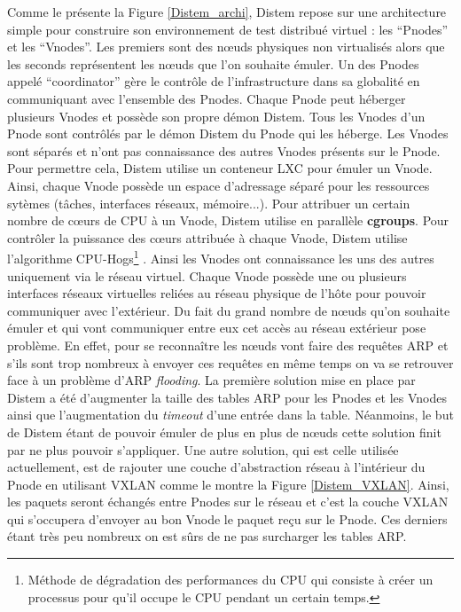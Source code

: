 Comme le présente la Figure \ref{Distem_archi}, Distem repose sur une
architecture simple pour construire son environnement de test distribué virtuel
: les ``Pnodes'' et les ``Vnodes''. Les premiers sont des n\oe uds physiques non
virtualisés alors que les seconds représentent les n\oe uds que l'on souhaite
émuler. Un des Pnodes appelé ``coordinator'' gère le contrôle de
l'infrastructure dans sa globalité en communiquant avec l'ensemble des
Pnodes. Chaque Pnode peut héberger plusieurs Vnodes et possède son
propre démon Distem. Tous les Vnodes d'un Pnode sont contrôlés par le
démon Distem du Pnode qui les héberge. Les Vnodes sont séparés et n'ont
pas connaissance des autres Vnodes présents sur le Pnode. Pour permettre
cela, Distem utilise un conteneur LXC pour émuler un Vnode. Ainsi, chaque
Vnode possède un espace d'adressage séparé pour les ressources sytèmes
(tâches, interfaces réseaux, mémoire...). Pour attribuer un certain nombre de
c\oe urs de CPU à un Vnode, Distem utilise en parallèle \textbf{cgroups}. Pour contrôler la puissance des c\oe urs attribuée à chaque
Vnode, Distem utilise l'algorithme CPU-Hogs\footnote{Méthode de dégradation
  des performances du CPU qui consiste à créer un processus pour qu'il occupe le
  CPU pendant un certain temps.} \citep{DISTEM_buchert2011methods}. Ainsi les
Vnodes ont connaissance les uns des autres uniquement via le réseau
virtuel. Chaque  Vnode possède une ou plusieurs interfaces réseaux virtuelles
reliées au réseau physique de l'hôte pour pouvoir communiquer avec
l'extérieur. Du fait du grand nombre de n\oe uds qu'on souhaite émuler et qui
vont communiquer entre eux cet accès au réseau extérieur pose problème. En
effet, pour se reconnaître les n\oe uds vont faire des requêtes ARP et s'ils
sont trop nombreux à envoyer ces requêtes en même temps on va se retrouver face
à un problème d'ARP \textit{flooding}. La première solution mise en place par Distem a
été d'augmenter la taille des tables ARP pour les Pnodes et les Vnodes
ainsi que l'augmentation du \textit{timeout} d'une entrée dans la
table. Néanmoins, le but de Distem étant de pouvoir émuler de plus en plus de
n\oe uds cette solution finit par ne plus pouvoir s'appliquer. Une autre
solution, qui est celle utilisée actuellement, est de rajouter une couche
d'abstraction réseau à l'intérieur du Pnode en utilisant
VXLAN \citep{VXLAN_mahalingam2014virtual, DISTEM_buchert2014emulation} comme le
montre la Figure \ref{Distem_VXLAN}. Ainsi, les paquets seront échangés entre
Pnodes sur le réseau et c'est la couche VXLAN qui s'occupera d'envoyer au
bon Vnode le paquet reçu sur le Pnode. Ces derniers étant très peu
nombreux on est sûrs de ne pas surcharger les tables ARP.

